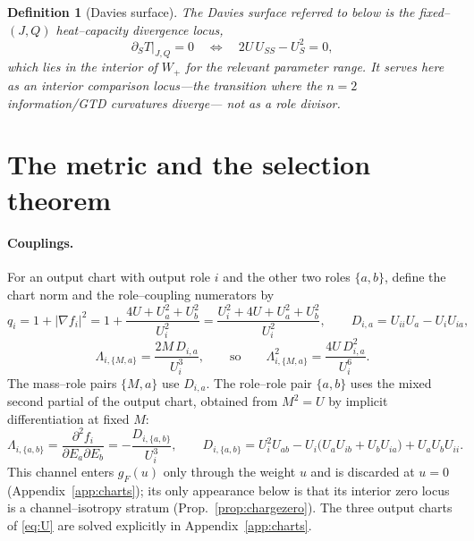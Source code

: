 \documentclass[11pt]{article}
\newtheorem{definition}[theorem]{Definition}
\newcommand{\Wp}{W_{+}}
\begin{document}
\begin{definition}[Davies surface]
\label{def:davies}
The Davies surface referred to below is the fixed--$(J,Q)$ heat--capacity divergence locus,
\[
\partial_S T\big|_{J,Q}=0\quad\Longleftrightarrow\quad 2U\,U_{SS}-U_S^2=0 ,
\]
which lies in the interior of $\Wp$ for the relevant parameter range. It serves here as an
interior comparison locus---the transition where the $n=2$ information/GTD curvatures diverge---%
\emph{not} as a role divisor.
\end{definition}

\section{The metric and the selection theorem}
\label{sec:selection}

\paragraph{Couplings.}
For an output chart with output role $i$ and the other two roles $\{a,b\}$, define the chart
norm and the role--coupling numerators by
\begin{equation}
q_i=1+|\nabla f_i|^2=1+\frac{4U+U_a^2+U_b^2}{U_i^2}=\frac{U_i^2+4U+U_a^2+U_b^2}{U_i^2},\qquad
D_{i,a}=U_{ii}U_a-U_iU_{ia},
\label{eq:qi}
\end{equation}
\begin{equation}
\Lambda_{i,\{M,a\}}=\frac{2M\,D_{i,a}}{U_i^3},\qquad\text{so}\qquad
\Lambda_{i,\{M,a\}}^2=\frac{4U\,D_{i,a}^2}{U_i^6}.
\label{eq:couplings}
\end{equation}
The mass--role pairs $\{M,a\}$ use $D_{i,a}$. The role--role pair $\{a,b\}$ uses the mixed
second partial of the output chart, obtained from $M^2=U$ by implicit differentiation at fixed
$M$:
\begin{equation}
\Lambda_{i,\{a,b\}}=\frac{\partial^2 f_i}{\partial E_a\partial E_b}
=-\frac{D_{i,\{a,b\}}}{U_i^3},\qquad
D_{i,\{a,b\}}=U_i^2U_{ab}-U_i\big(U_aU_{ib}+U_bU_{ia}\big)+U_aU_bU_{ii}.
\label{eq:rr}
\end{equation}
This channel enters $g_F(u)$ only through the weight $u$ and is discarded at $u=0$
(Appendix~\ref{app:charts}); its only appearance below is that its interior zero locus is a
channel--isotropy stratum (Prop.~\ref{prop:chargezero}). The three output charts of
\eqref{eq:U} are solved explicitly in Appendix~\ref{app:charts}.
\end{document}
